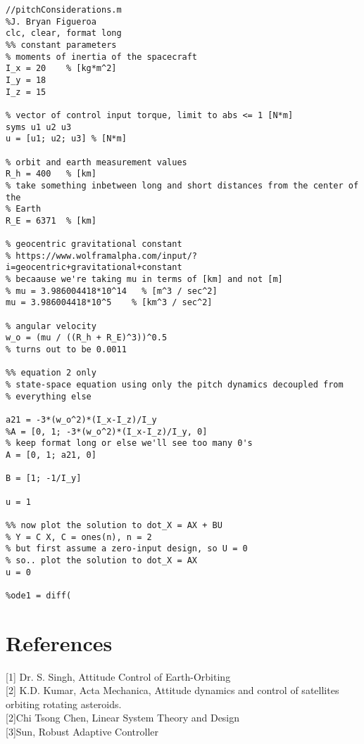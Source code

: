 \documentclass{article}
\begin{document}
\begin{lstlisting}
//pitchConsiderations.m
%J. Bryan Figueroa
clc, clear, format long
%% constant parameters
% moments of inertia of the spacecraft
I_x = 20    % [kg*m^2]
I_y = 18
I_z = 15

% vector of control input torque, limit to abs <= 1 [N*m]
syms u1 u2 u3
u = [u1; u2; u3] % [N*m]

% orbit and earth measurement values
R_h = 400   % [km]
% take something inbetween long and short distances from the center of the
% Earth
R_E = 6371  % [km]

% geocentric gravitational constant
% https://www.wolframalpha.com/input/?i=geocentric+gravitational+constant
% becaause we're taking mu in terms of [km] and not [m]
% mu = 3.986004418*10^14   % [m^3 / sec^2]
mu = 3.986004418*10^5    % [km^3 / sec^2]

% angular velocity
w_o = (mu / ((R_h + R_E)^3))^0.5
% turns out to be 0.0011

%% equation 2 only
% state-space equation using only the pitch dynamics decoupled from
% everything else

a21 = -3*(w_o^2)*(I_x-I_z)/I_y
%A = [0, 1; -3*(w_o^2)*(I_x-I_z)/I_y, 0]
% keep format long or else we'll see too many 0's
A = [0, 1; a21, 0]

B = [1; -1/I_y]

u = 1

%% now plot the solution to dot_X = AX + BU
% Y = C X, C = ones(n), n = 2
% but first assume a zero-input design, so U = 0
% so.. plot the solution to dot_X = AX
u = 0

%ode1 = diff(

\end{lstlisting}

\section{References}
[1] Dr. S. Singh, Attitude Control of Earth-Orbiting  \\

[2] K.D. Kumar, Acta Mechanica, Attitude dynamics and control of satellites orbiting rotating asteroids. \\

[2]Chi Tsong Chen, Linear System Theory and Design \\

[3]Sun, Robust Adaptive Controller\\
\end{document}
